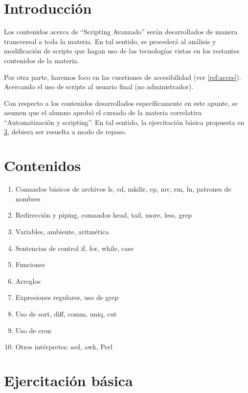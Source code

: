\section{Introducción}
Los contenidos acerca de ``Scripting Avanzado'' serán desarrollados de manera
transversal a toda la materia. En tal sentido, se procederá al análisis y 
modificación de scripts que hagan uso de las tecnologías vistas en los 
restantes contenidos de la materia. 

Por otra parte, haremos foco en las cuestiones de accesibilidad (ver \ref{ref:acces}). Acercando 
el uso de scripts al usuario final (no administrador). 

Con respecto a los contenidos desarrollados específicamente en este apunte, se asumen que el alumno aprobó el cursado de la materia correlativa ``Automatización y scripting''. En tal sentido, la ejercitación básica propuesta en \ref{ref:ejbasica}, debiera ser resuelta a modo de repaso. 

\section {Contenidos}

\begin{enumerate}
\item Comandos básicos de archivos ls, cd, mkdir, cp, mv, rm, ln, patrones de nombres
\item Redirección y piping, comandos head, tail, more, less, grep
\item Variables, ambiente, aritmética
\item Sentencias de control if, for, while, case
\item Funciones
\item Arreglos
\item Expresiones regulares, uso de grep
\item Uso de sort, diff, comm, uniq, cut
\item Uso de cron
\item Otros intérpretes: sed, awk, Perl
\end{enumerate}

\section{Ejercitación básica}\label{ref:ejbasica}

